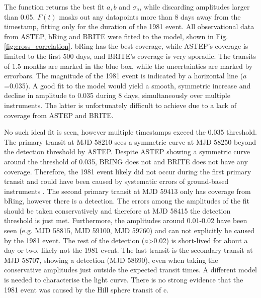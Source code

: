 %
%
The function returns the best fit $a, b$ and $\sigma_a$, while discarding amplitudes larger than 0.05.
%
%
$F(t)$ masks out any datapoints more than 8 days away from the timestamp, fitting only for the duration of the 1981 event.
%
All observational data from ASTEP, bRing and BRITE were fitted to the model, shown in Fig. \ref{fig:cross_correlation}.
%
bRing has the best coverage, while ASTEP's coverage is limited to the first 500 days, and BRITE's coverage is very sporadic.  
%
The transits of 1.5 months are marked in the blue box, while the uncertainties are marked by errorbars.
%
The magnitude of the 1981 event is indicated by a horizontal line ($a$=0.035). 
%
A good fit to the model would yield a smooth, symmetric increase and decline in amplitude to 0.035 during 8 days, simultaneously over multiple instruments.
%
The latter is unfortunately difficult to achieve due to a lack of coverage from ASTEP and BRITE. 
%

No such ideal fit is seen, however multiple timestamps exceed the 0.035 threshold.
The primary transit at MJD 58210 sees a symmetric curve at MJD 58250 beyond the detection threshold by ASTEP. 
%
Despite ASTEP showing a symmetric curve around the threshold of 0.035, BRING does not and BRITE does not have any coverage.
%
Therefore, the 1981 event likely did not occur during the first primary transit and could have been caused by systematic errors of ground-based instruments \citep{Kenworthy_2021}.
%
The second primary transit at MJD 59413 only has coverage from bRing, however there is a detection.
%
The errors among the amplitudes of the fit should be taken conservatively and therefore at MJD 58415 the detection threshold is just met.
%
Furthermore, the amplitudes around 0.01-0.02 have been seen (e.g. MJD 58815, MJD 59100, MJD 59760) and can not explicitly be caused by the 1981 event.
%
The rest of the detection ($a$>0.02) is short-lived for about a day or two, likely not the 1981 event.
%
The last transit is the secondary transit at MJD 58707, showing a detection (MJD 58690), even when taking the conservative amplitudes just outside the expected transit times.
%
A different model is needed to characterise the light curve.
%
There is no strong evidence that the 1981 event was caused by the Hill sphere transit of \pic c.  

